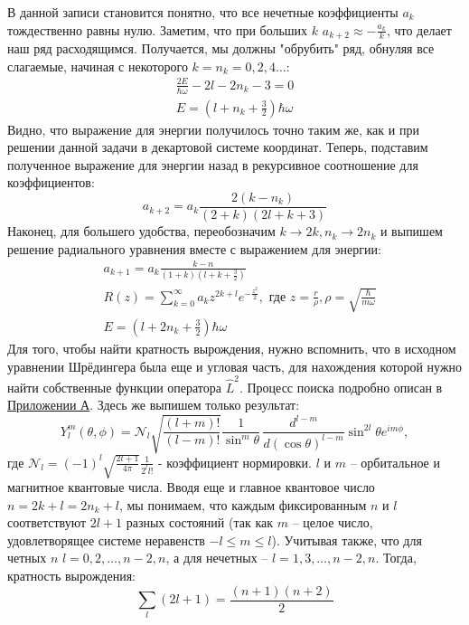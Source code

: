 В данной записи становится понятно, что все нечетные коэффициенты $a_k$ тождественно равны нулю. Заметим, что при больших $k$ $a_{k+2} \approx -\frac{a_k}{k}$, что делает наш ряд расходящимся. Получается, мы должны "обрубить" ряд, обнуляя все слагаемые, начиная с некоторого $k = n_k = 0, 2, 4 \dots$:
\begin{gather*}
    \frac{2E}{\hbar\omega}-2l-2n_k-3 = 0\\
    E = \left(l+n_k+\frac{3}{2}\right)\hbar\omega
\end{gather*}
Видно, что выражение для энергии получилось точно таким же, как и при решении данной задачи в декартовой системе координат. Теперь, подставим полученное выражение для энергии назад в рекурсивное соотношение для коэффициентов:
\[
a_{k+2} = a_k\frac{2(k-n_k)}{(2+k)(2l+k+3)}
\]
Наконец, для большего удобства, переобозначим $k\rightarrow2k, n_k\rightarrow2n_k$ и выпишем решение радиального уравнения вместе с выражением для энергии:
\begin{align*}
    &a_{k+1} = a_k\frac{k-n}{\left(1+k\right)\left(l+k+\frac{3}{2}\right)} \\
    &R(z) = \sum_{k=0}^\infty a_k z^{2k+l} e^{-\frac{z^2}{2}}, \text{ где } z = \frac{r}{\rho}, \rho = \sqrt{\frac{\hbar}{m\omega}} \\
    &E = \left(l+2n_k+\frac{3}{2}\right)\hbar\omega
\end{align*}
Для того, чтобы найти кратность вырождения, нужно вспомнить, что в исходном уравнении Шрёдингера была еще и угловая часть, для нахождения которой нужно найти собственные функции оператора $\hat{L}^2$. Процесс поиска подробно описан в \hyperref[appendix:A]{Приложении А}. Здесь же выпишем только результат:
\[
Y^m_l(\theta, \phi) = \mathcal{N}_l\sqrt{\frac{(l+m)!}{(l-m)!}} \frac{1}{\sin^{m}\theta}\,\frac{d^{l-m}}{d(\cos\theta)^{l-m}}\sin^{2l}\theta e^{im\phi},
\]
где $\mathcal{N}_l = (-1)^l \sqrt{\frac{2l+1}{4\pi}}\frac{1}{2^l l!}$ - коэффициент нормировки. $l$ и $m$ -- орбитальное и магнитное квантовые числа. Вводя еще и главное квантовое число $n=2k+l=2n_k+l$, мы понимаем, что каждым фиксированным $n$ и $l$ соответствуют $2l+1$ разных состояний (так как $m$ -- целое число, удовлетворящее системе неравенств $-l\leq m\leq l$). Учитывая также, что для четных $n$ $l = 0, 2, \dots, n-2, n$, а для нечетных -- $l = 1, 3, \dots, n-2, n$. Тогда, кратность вырождения:
\[
\sum_l (2l+1) = \frac{(n+1)(n+2)}{2}
\]




